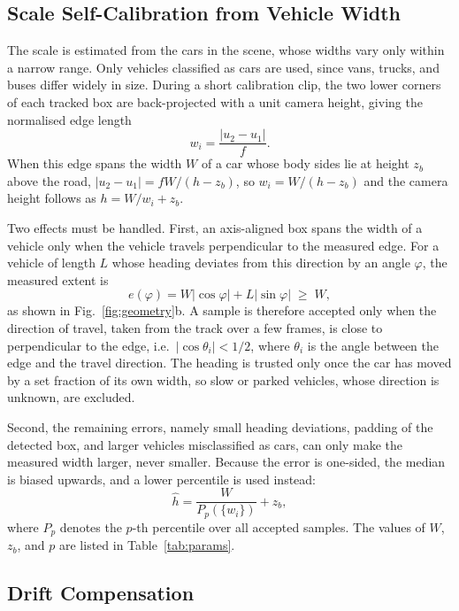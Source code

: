 \documentclass[conference]{IEEEtran}
\begin{document}
\subsection{Scale Self-Calibration from Vehicle Width}

The scale is estimated from the cars in the scene, whose widths vary only within a narrow range. Only vehicles classified as cars are used, since vans, trucks, and buses differ widely in size. During a short calibration clip, the two lower corners of each tracked box are back-projected with a unit camera height, giving the normalised edge length
\begin{equation}
w_i = \frac{|u_2 - u_1|}{f}.
\end{equation}
When this edge spans the width $W$ of a car whose body sides lie at height $z_b$ above the road, $|u_2-u_1| = fW/(h-z_b)$, so $w_i = W/(h-z_b)$ and the camera height follows as $h = W/w_i + z_b$.

Two effects must be handled. First, an axis-aligned box spans the width of a vehicle only when the vehicle travels perpendicular to the measured edge. For a vehicle of length $L$ whose heading deviates from this direction by an angle $\varphi$, the measured extent is
\begin{equation}
e(\varphi) = W|\cos\varphi| + L|\sin\varphi| \;\geq\; W,
\label{eq:extent}
\end{equation}
as shown in Fig.~\ref{fig:geometry}b. A sample is therefore accepted only when the direction of travel, taken from the track over a few frames, is close to perpendicular to the edge, i.e.\ $|\cos\theta_i| < 1/2$, where $\theta_i$ is the angle between the edge and the travel direction. The heading is trusted only once the car has moved by a set fraction of its own width, so slow or parked vehicles, whose direction is unknown, are excluded.

Second, the remaining errors, namely small heading deviations, padding of the detected box, and larger vehicles misclassified as cars, can only make the measured width larger, never smaller. Because the error is one-sided, the median is biased upwards, and a lower percentile is used instead:
\begin{equation}
\hat{h} = \frac{W}{P_p\left(\{w_i\}\right)} + z_b,
\label{eq:scale}
\end{equation}
where $P_p$ denotes the $p$-th percentile over all accepted samples. The values of $W$, $z_b$, and $p$ are listed in Table~\ref{tab:params}.

\subsection{Drift Compensation}
\end{document}
